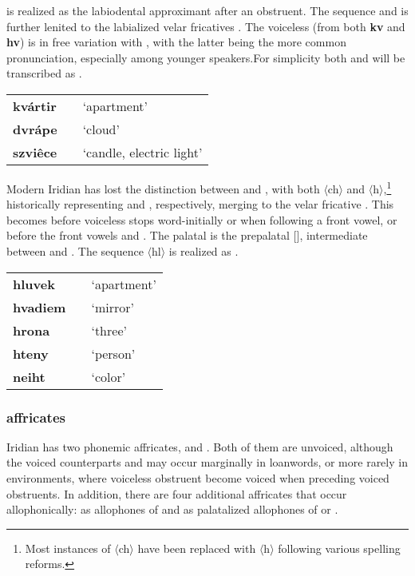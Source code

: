 \par {} is realized as the labiodental approximant  after an obstruent. The sequence  and  is further lenited to the labialized velar fricatives . The voiceless  (from both \textbf{kv} and \textbf{hv}) is in free variation with , with the latter being the more common pronunciation, especially among younger speakers.For simplicity both  and  will be transcribed as .

\begin{center} \small
	\begin{tabularx}{0.8\textwidth}{>{\bfseries}YYY}
		kvártir		&  			& `apartment'\\
		dvrápe		& 				&`cloud'\\
		szviêce		& 	& `candle, electric light'\\
	\end{tabularx}
\end{center}

\par Modern Iridian has lost the distinction between  and , with both $\langle$ch$\rangle$ and $\langle$h$\rangle$,\footnote{Most instances of $\langle$ch$\rangle$ have been replaced with $\langle$h$\rangle$ following various spelling reforms.} historically representing  and , respectively, merging to the velar fricative . This becomes  before voiceless stops word-initially or when following a front vowel, or before the front vowels  and . The palatal  is the prepalatal [], intermediate between  and . The sequence $\langle$hl$\rangle$ is realized as \pn{\textbeltl}.

\begin{center} \small
	\begin{tabularx}{0.8\textwidth}{>{\bfseries}YYY}
		hluvek		& 		& `apartment'\\
		hvadiem		& 				&`mirror'\\
		hrona		& 	& `three'\\
		hteny		& 	&`person'\\
		neiht		&  & `color'\\
	\end{tabularx}
\end{center}
\subsubsection{affricates}
\par Iridian has two phonemic affricates,  and . Both of them are unvoiced, although the voiced counterparts  and  may occur marginally in loanwords, or more rarely in  environments, where voiceless obstruent become voiced when preceding voiced obstruents. In addition, there are four additional affricates that occur allophonically:  as allophones of  and  as palatalized allophones of  or .
\par 
